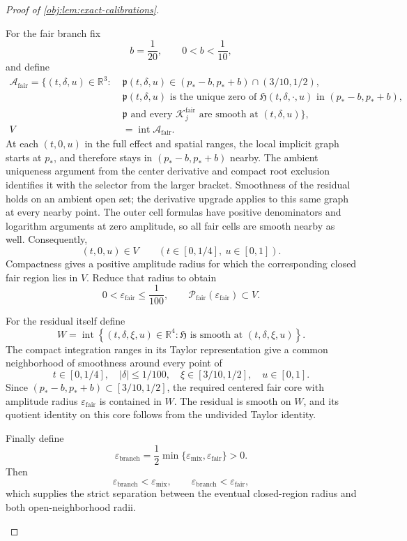 \begin{proof}[Proof of \cref{obj:lem:exact-calibrations}]
\begin{enumerate}
For the fair branch fix
\[
b=\frac1{20},\qquad 0<b<\frac1{10},
\]
and define
\[
\begin{aligned}
\mathcal A_{\mathrm{fair}}
=\bigl\{(t,\delta,u)\in\mathbb R^3:\;&
\mathfrak p(t,\delta,u)\in(p_*-b,p_*+b)\cap(3/10,1/2),\\
&\mathfrak p(t,\delta,u)
\text{ is the unique zero of }
\mathfrak H(t,\delta,\cdot,u)
\text{ in }(p_*-b,p_*+b),\\
&\mathfrak p\text{ and every }\mathcal K^{\mathrm{fair}}_j
\text{ are smooth at }(t,\delta,u)\bigr\},\\
V&=\operatorname{int}\mathcal A_{\mathrm{fair}}.
\end{aligned}
\]
At each \((t,0,u)\) in the full effect and spatial ranges, the local implicit graph starts at \(p_*\), and therefore stays in
\((p_*-b,p_*+b)\) nearby. The ambient uniqueness argument from the center derivative and compact root exclusion identifies it with the selector from the larger bracket. Smoothness of the residual holds on an ambient open set; the derivative upgrade applies to this same graph at every nearby point. The outer cell formulas have positive denominators and logarithm arguments at zero amplitude, so all fair cells are smooth nearby as well. Consequently,
\[
(t,0,u)\in V
\qquad(t\in[0,1/4],\ u\in[0,1]).
\]
Compactness gives a positive amplitude radius for which the corresponding closed fair region lies in \(V\). Reduce that radius to obtain
\[
0<\varepsilon_{\mathrm{fair}}\le\frac1{100},
\qquad
\mathcal P_{\mathrm{fair}}(\varepsilon_{\mathrm{fair}})\subset V.
\]

For the residual itself define
\[
W=
\operatorname{int}
\left\{
(t,\delta,\xi,u)\in\mathbb R^4:
\mathfrak H\text{ is smooth at }(t,\delta,\xi,u)
\right\}.
\]
The compact integration ranges in its Taylor representation give a common neighborhood of smoothness around every point of
\[
t\in[0,1/4],\quad |\delta|\le1/100,\quad
\xi\in[3/10,1/2],\quad u\in[0,1].
\]
Since
\((p_*-b,p_*+b)\subset[3/10,1/2]\), the required centered fair core with amplitude radius \(\varepsilon_{\mathrm{fair}}\) is contained in \(W\). The residual is smooth on \(W\), and its quotient identity on this core follows from the undivided Taylor identity.

Finally define
\[
\varepsilon_{\mathrm{branch}}
=\frac12\min\{\varepsilon_{\mathrm{mix}},
             \varepsilon_{\mathrm{fair}}\}>0.
\]
Then
\[
\varepsilon_{\mathrm{branch}}<\varepsilon_{\mathrm{mix}},
\qquad
\varepsilon_{\mathrm{branch}}<\varepsilon_{\mathrm{fair}},
\]
which supplies the strict separation between the eventual closed-region radius and both open-neighborhood radii.


\end{enumerate}
\end{proof}
